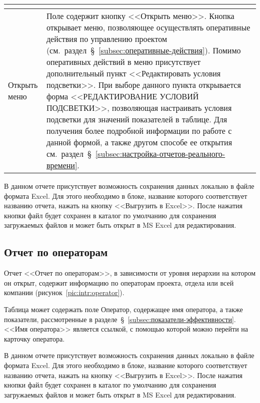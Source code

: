 \begin{table}[ht]
\begin{small}
\begin{tabular}{|p{}|p{}|}
\begin{itemize}
            \end{itemize} \\
            \hline
            Открыть меню & Поле содержит кнопку <<Открыть меню>>.
            Кнопка открывает меню, позволяющее осуществлять оперативные действия по управлению проектом
            (см.~раздел~\S~\ref{subsec:оперативные-действия}).
            Помимо оперативных действий в меню присутствует дополнительный пункт <<Редактировать условия подсветки>>.
            При выборе данного пункта открывается форма <<РЕДАКТИРОВАНИЕ УСЛОВИЙ ПОДСВЕТКИ>>,
            позволяющая настраивать условия подсветки для значений показателей в таблице.
            Для получения более подробной информации по работе с данной формой,
            а также другом способе ее открытия см.~раздел~\S~\ref{subsec:настройка-отчетов-реального-времени}. \\
            \hline
        \end{tabular}
    \end{small}
    \label{tab:prj:incoming:fields}
\end{table}

В данном отчете присутствует возможность сохранения данных локально в файле формата Excel.
Для этого необходимо в блоке, название которого соответствует названию отчета, нажать на кнопку <<Выгрузить в Excel>>.
После нажатия кнопки файл будет сохранен в каталог по умолчанию для сохранения загружаемых файлов и может быть открыт в MS Excel для редактирования.

\subsection{Отчет по операторам}

Отчет <<Отчет по операторам>>, в зависимости от уровня иерархии на котором он открыт,
содержит информацию по операторам проекта, отдела или всей компании (рисунок~\ref{pic:intr:operator}).

Таблица может содержать поле Оператор, содержащее имя оператора, а также показатели, рассмотренные в разделе~\S~\ref{subsec:показатели-эффективности}.
<<Имя оператора>> является ссылкой, с помощью которой можно перейти на карточку оператора.

В данном отчете присутствует возможность сохранения данных локально в файле формата Excel.
Для этого необходимо в блоке, название которого соответствует названию отчета, нажать на кнопку <<Выгрузить в Excel>>.
После нажатия кнопки файл будет сохранен в каталог по умолчанию для сохранения загружаемых файлов и может быть открыт в MS Excel для редактирования.

